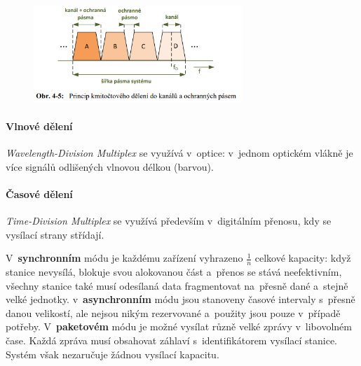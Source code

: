 \begin{figure}[ht]
	\centering
	\includegraphics[width=0.7\textwidth]{images/q04_frequency}
\end{figure}

\paragraph{Vlnové dělení} \emph{Wavelength-Division Multiplex} se využívá v~optice: v~jednom optickém vlákně je více signálů odlišených vlnovou délkou (barvou).

\paragraph{Časové dělení} \emph{Time-Division Multiplex} se využívá především v~digitálním přenosu, kdy se vysílací strany střídají.

V~\textbf{synchronním} módu je každému zařízení vyhrazeno $\frac{1}{n}$ celkové kapacity: když stanice nevysílá, blokuje svou alokovanou část a~přenos se stává neefektivním, všechny stanice také musí odesílaná data fragmentovat na~přesně dané a~stejně velké jednotky.
v~\textbf{asynchronním} módu jsou stanoveny časové intervaly s~přesně danou velikostí, ale nejsou nikým rezervované a~použity jsou pouze v~případě potřeby.
V~\textbf{paketovém} módu je možné vysílat různě velké zprávy v~libovolném čase. Každá zpráva musí obsahovat záhlaví s~identifikátorem vysílací stanice. Systém však nezaručuje žádnou vysílací kapacitu.

